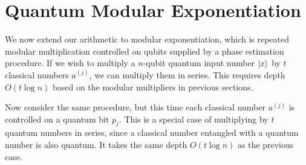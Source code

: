 \documentclass[twoside]{article}
\begin{document}
%
\section{Quantum Modular Exponentiation}
\label{sec:modexp}

We now extend our arithmetic to modular exponentiation, which is repeated
modular multiplication controlled on qubits supplied by a phase estimation
procedure.
If we wish to multiply a $n$-qubit quantum input number $\left\vert{x}\right\rangle$ by
$t$ classical numbers $a^{(j)}$, we can multiply them in series.
This requires depth $O(t\log n)$ based on the modular multipliers in previous
sections.


Now consider the same procedure, but this time each classical number $a^{(j)}$
is controlled on a quantum bit $p_j$. This is a special case of
multiplying by $t$ quantum numbers in series, since a classical number
entangled with a quantum number is also quantum.
It takes the same depth $O(t\log n)$ as the previous case.
%
\end{document}
